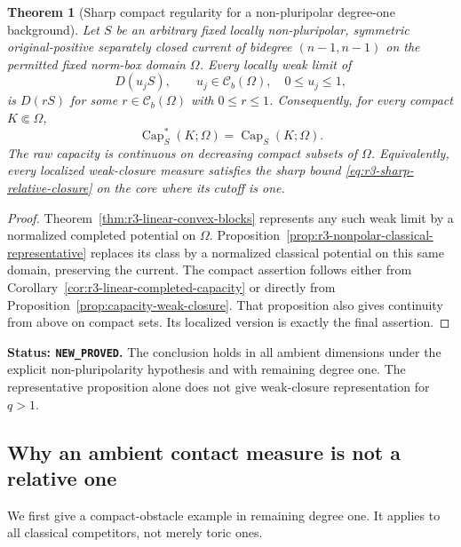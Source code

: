 \documentclass[11pt,a4paper]{article}
\numberwithin{equation}{section}
\newtheorem{theorem}{Theorem}[section]
\theoremstyle{definition}
\theoremstyle{remark}
\newcommand{\Cb}{\mathcal C_b}
\begin{document}
\begin{theorem}[Sharp compact regularity for a non-pluripolar degree-one background]
\label{thm:r3-nonpolar-linear-compact-regularity}
Let $S$ be an arbitrary fixed locally non-pluripolar,
symmetric original-positive separately closed current of
bidegree $(n-1,n-1)$ on the permitted fixed norm-box domain
$\Omega$. Every locally weak limit of
\[
 D(u_jS),\qquad u_j\in\Cb(\Omega),\quad0\leq u_j\leq1,
\]
is $D(rS)$ for some $r\in\Cb(\Omega)$ with $0\leq r\leq1$.
Consequently, for every compact $K\Subset\Omega$,
\[
 \operatorname{Cap}_S^*(K;\Omega)
       =\operatorname{Cap}_S(K;\Omega).
\]
The raw capacity is continuous on decreasing compact subsets
of $\Omega$. Equivalently, every localized weak-closure
measure satisfies the sharp bound
\eqref{eq:r3-sharp-relative-closure} on the core where its
cutoff is one.
\end{theorem}

\begin{proof}
Theorem~\ref{thm:r3-linear-convex-blocks} represents any such
weak limit by a normalized completed potential on $\Omega$.
Proposition~\ref{prop:r3-nonpolar-classical-representative}
replaces its class by a normalized classical potential on
this same domain, preserving the current.
The compact assertion follows either from
Corollary~\ref{cor:r3-linear-completed-capacity} or directly
from Proposition~\ref{prop:capacity-weak-closure}.
That proposition also gives continuity from above on compact
sets. Its localized version is exactly the final assertion.
\end{proof}

\noindent\textbf{Status: \texttt{NEW\_PROVED}.}
The conclusion holds in all ambient dimensions under the
explicit non-pluripolarity hypothesis and with remaining
degree one. The representative proposition alone does not
give weak-closure representation for $q>1$.

\subsection{Why an ambient contact measure is not a relative one}

We first give a compact-obstacle example in remaining degree one.
It applies to all classical competitors, not merely toric ones.
\end{document}
